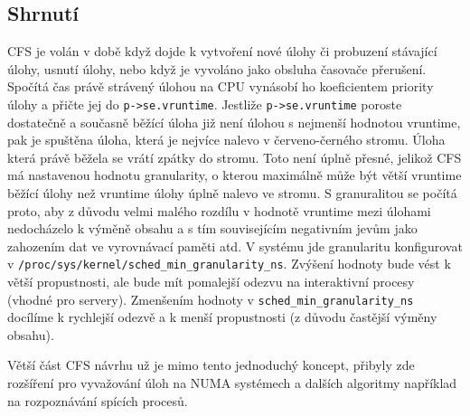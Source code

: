 \documentclass[a4paper,12pt]{article}
\begin{document}
%
%
%
%
%
%
%

\subsection{Shrnutí}

CFS je volán v době když dojde k vytvoření nové úlohy či probuzení stávající úlohy, usnutí úlohy, nebo když je vyvoláno jako obsluha časovače přerušení. Spočítá čas právě strávený úlohou na CPU vynásobí ho koeficientem priority úlohy a přičte jej do \verb#p->se.vruntime#. Jestliže \verb#p->se.vruntime# poroste dostatečně a současně běžící úloha již není úlohou s nejmenší hodnotou vruntime, pak je spuštěna úloha, která je nejvíce nalevo v červeno-černého stromu. Úloha která právě běžela se vrátí zpátky do stromu. Toto není úplně přesné, jelikož CFS má nastavenou hodnotu granularity, o kterou maximálně může být větší vruntime běžící úlohy než vruntime úlohy úplně nalevo ve stromu. S granuralitou se počítá proto, aby z důvodu velmi malého rozdílu v hodnotě vruntime mezi úlohami nedocházelo k výměně obsahu a s tím souvisejícím negativním jevům jako zahozením dat ve vyrovnávací paměti atd.
V systému jde granularitu konfigurovat v \verb#/proc/sys/kernel/sched_min_granularity_ns#. Zvýšení hodnoty bude vést k větší propustnosti, ale bude mít pomalejší odezvu na interaktivní procesy (vhodné pro servery). Zmenšením hodnoty  v \verb#sched_min_granularity_ns# docílíme k rychlejší odezvě a k menší propustnosti (z důvodu častější výměny obsahu).

Větší část CFS návrhu už je mimo tento jednoduchý koncept, přibyly zde rozšíření pro vyvažování úloh na NUMA systémech a dalších algoritmy například na rozpoznávání spících procesů.
\end{document}

